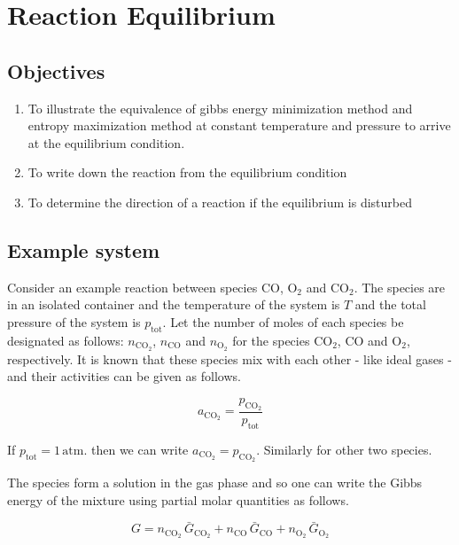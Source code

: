 
\section{Reaction Equilibrium}

\subsection{Objectives}

\begin{enumerate}
\item To illustrate the equivalence of gibbs energy minimization method and entropy maximization method at constant temperature and pressure to arrive at the equilibrium condition.
\item To write down the reaction from the equilibrium condition
\item To determine the direction of a reaction if the equilibrium is disturbed
\end{enumerate}

\subsection{Example system}

Consider an example reaction between species $\text{CO}$, $\text{O}_2$ and $\text{CO}_2$.  The species are in an isolated container and the temperature of the system is $T$ and the total pressure of the system is $p_\text{tot}$. Let the number of moles of each species be designated as follows: $n_{\text{CO}_2}$, $n_\text{CO}$ and $n_{\text{O}_2}$ for the species $\text{CO}_2$, $\text{CO}$ and $\text{O}_2$, respectively. It is known that these species mix with each other - like ideal gases - and their activities can be given as follows.

\begin{equation}
a_{\text{CO}_2} = \frac{ p_{\text{CO}_2}}{p_\text{tot}}
\end{equation}

If $p_\text{tot} = 1 \, \text{atm.}$ then we can write $a_{\text{CO}_2} = p_{\text{CO}_2}$. Similarly for other two species.

The species form a solution in the gas phase and so one can write the Gibbs energy of the mixture using partial molar quantities as follows.

\begin{equation}
 G = n_{\text{CO}_2} \, \bar{G}_{\text{CO}_2} + n_\text{CO} \, \bar{G}_\text{CO} + n_{\text{O}_2} \, \bar{G}_{\text{O}_2} \end{equation}


